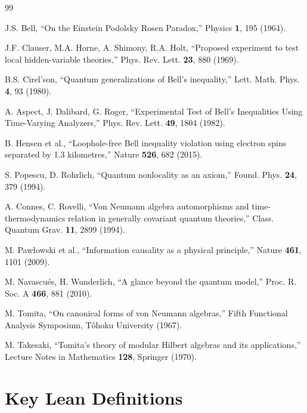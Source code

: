 \documentclass[12pt,a4paper]{article}
\begin{document}
\begin{thebibliography}{99}

J.S. Bell, ``On the Einstein Podolsky Rosen Paradox,'' Physics \textbf{1}, 195 (1964).

J.F. Clauser, M.A. Horne, A. Shimony, R.A. Holt, ``Proposed experiment to test local hidden-variable theories,'' Phys. Rev. Lett. \textbf{23}, 880 (1969).

B.S. Cirel'son, ``Quantum generalizations of Bell's inequality,'' Lett. Math. Phys. \textbf{4}, 93 (1980).

A. Aspect, J. Dalibard, G. Roger, ``Experimental Test of Bell's Inequalities Using Time-Varying Analyzers,'' Phys. Rev. Lett. \textbf{49}, 1804 (1982).

B. Hensen et al., ``Loophole-free Bell inequality violation using electron spins separated by 1.3 kilometres,'' Nature \textbf{526}, 682 (2015).

S. Popescu, D. Rohrlich, ``Quantum nonlocality as an axiom,'' Found. Phys. \textbf{24}, 379 (1994).

A. Connes, C. Rovelli, ``Von Neumann algebra automorphisms and time-thermodynamics relation in generally covariant quantum theories,'' Class. Quantum Grav. \textbf{11}, 2899 (1994).

M. Pawłowski et al., ``Information causality as a physical principle,'' Nature \textbf{461}, 1101 (2009).

M. Navascués, H. Wunderlich, ``A glance beyond the quantum model,'' Proc. R. Soc. A \textbf{466}, 881 (2010).

M. Tomita, ``On canonical forms of von Neumann algebras,'' Fifth Functional Analysis Symposium, Tôhoku University (1967).

M. Takesaki, ``Tomita's theory of modular Hilbert algebras and its applications,'' Lecture Notes in Mathematics \textbf{128}, Springer (1970).

\end{thebibliography}

\appendix

\section{Key Lean Definitions}
\end{document}
